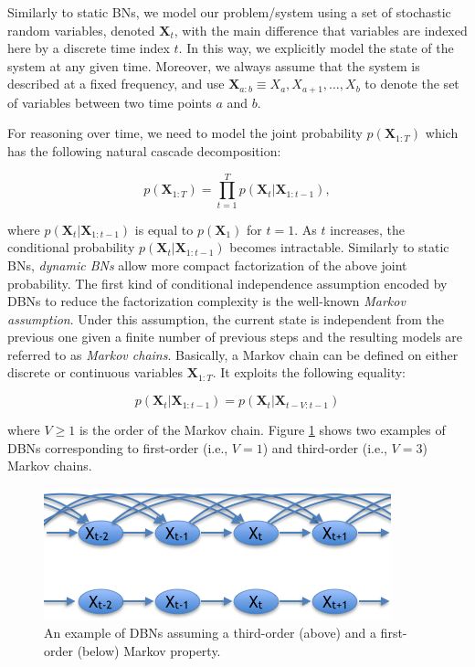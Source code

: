 Similarly to static BNs, we model our problem/system using a set of stochastic random variables, denoted $\bm X_t$, with the main difference that variables are indexed here by a discrete time index $t$. In this way, we explicitly model the state of the system at any given time. Moreover, we always assume that the system is described at a fixed frequency, and use $\bm X_{a:b} \equiv X_a,X_{a+1},\ldots,X_{b}$ to denote the set of variables between two time points $a$ and $b$.  

For reasoning over time, we need to model the joint probability $p(\bm X_{1:T})$ which has the following natural cascade decomposition:

$$p(\bm X_{1:T})  = \prod_{t=1}^T p(\bm X_t|\bm X_{1:t-1}),$$

\noindent where $p(\bm X_t|\bm X_{1:t-1})$ is equal to $p(\bm X_1)$ for $t=1$. As $t$ increases, the conditional probability $p(\bm X_t|\bm X_{1:t-1})$ becomes intractable. Similarly to static BNs, \textit{dynamic BNs} allow more compact factorization of the above joint probability. The first kind of conditional independence assumption encoded by DBNs to reduce the factorization complexity is the well-known \textit{Markov assumption}. Under this assumption, the current state is independent from the previous one given a finite number of previous steps and the resulting models are referred to as \textit{Markov chains}. Basically, a Markov chain can be defined on either discrete or continuous variables $\bm X_{1:T}$. It exploits the following equality:

$$p(\bm X_t| \bm X_{1:t-1})  = p(\bm X_t|\bm X_{t-V:t-1})$$

\noindent where $V\geq 1$ is the order of the Markov chain. Figure \ref{Figure:markovChain} shows two examples of DBNs corresponding to first-order (i.e., $V=1$) and third-order (i.e., $V=3$) Markov chains. 

\begin{figure}[ht!]
\begin{center}
\includegraphics[scale=0.56]{./figures/PreliminariesMarkovChain}
\caption{\label{Figure:markovChain} An example of DBNs assuming a third-order (above) and a first-order (below) Markov property.
}
\end{center}
\end{figure}

